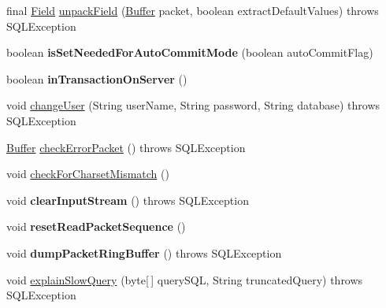 \begin{DoxyCompactItemize}
final \mbox{\hyperlink{classcom_1_1mysql_1_1jdbc_1_1_field}{Field}} \mbox{\hyperlink{classcom_1_1mysql_1_1jdbc_1_1_mysql_i_o_a2da4fe16e54a2d70893f1b5da3bdb1af}{unpack\+Field}} (\mbox{\hyperlink{classcom_1_1mysql_1_1jdbc_1_1_buffer}{Buffer}} packet, boolean extract\+Default\+Values)  throws S\+Q\+L\+Exception 
\item 
\mbox{\label{classcom_1_1mysql_1_1jdbc_1_1_mysql_i_o_a905b469bb29211ae5068baa141c3a4e2}} 
boolean {\bfseries is\+Set\+Needed\+For\+Auto\+Commit\+Mode} (boolean auto\+Commit\+Flag)
\item 
\mbox{\label{classcom_1_1mysql_1_1jdbc_1_1_mysql_i_o_adce0dbfb3ed6a68c40855e5b7948b19d}} 
boolean {\bfseries in\+Transaction\+On\+Server} ()
\item 
void \mbox{\hyperlink{classcom_1_1mysql_1_1jdbc_1_1_mysql_i_o_a2b65fc2cb7cccdb5923da263d37019ad}{change\+User}} (String user\+Name, String password, String database)  throws S\+Q\+L\+Exception 
\item 
\mbox{\hyperlink{classcom_1_1mysql_1_1jdbc_1_1_buffer}{Buffer}} \mbox{\hyperlink{classcom_1_1mysql_1_1jdbc_1_1_mysql_i_o_aa74c577f61133d4e06188e8903e5d6c2}{check\+Error\+Packet}} ()  throws S\+Q\+L\+Exception 
\item 
void \mbox{\hyperlink{classcom_1_1mysql_1_1jdbc_1_1_mysql_i_o_a83b397711c486862b282c060e1e7fd5f}{check\+For\+Charset\+Mismatch}} ()
\item 
\mbox{\label{classcom_1_1mysql_1_1jdbc_1_1_mysql_i_o_a204a5891acbca2ebde4e15cbf8f41452}} 
void {\bfseries clear\+Input\+Stream} ()  throws S\+Q\+L\+Exception 
\item 
\mbox{\label{classcom_1_1mysql_1_1jdbc_1_1_mysql_i_o_afaae7b1e0e7ae77feced10bc032de473}} 
void {\bfseries reset\+Read\+Packet\+Sequence} ()
\item 
\mbox{\label{classcom_1_1mysql_1_1jdbc_1_1_mysql_i_o_a4fa522522af077a7c1702c338d635c55}} 
void {\bfseries dump\+Packet\+Ring\+Buffer} ()  throws S\+Q\+L\+Exception 
\item 
void \mbox{\hyperlink{classcom_1_1mysql_1_1jdbc_1_1_mysql_i_o_a86ec9e7284f797edec7e5ec4880f2006}{explain\+Slow\+Query}} (byte\mbox{[}$\,$\mbox{]} query\+S\+QL, String truncated\+Query)  throws S\+Q\+L\+Exception 

\end{DoxyCompactItemize}
